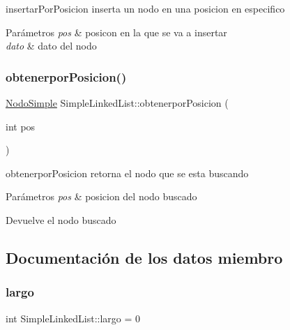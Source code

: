 insertar\+Por\+Posicion inserta un nodo en una posicion en especifico 


\begin{DoxyParams}{Parámetros}
{\em pos} & posicon en la que se va a insertar \\
\hline
{\em dato} & dato del nodo \\
\hline
\end{DoxyParams}
\mbox{\label{class_simple_linked_list_a443815291e245287229b5aca1d963faf}} 
\subsubsection{\texorpdfstring{obtenerpor\+Posicion()}{obtenerporPosicion()}}
{\footnotesize\ttfamily \mbox{\hyperlink{class_nodo_simple}{Nodo\+Simple}} Simple\+Linked\+List\+::obtenerpor\+Posicion (\begin{DoxyParamCaption}\item[{int}]{pos }\end{DoxyParamCaption})\hspace{0.3cm}{\ttfamily [inline]}}



obtenerpor\+Posicion retorna el nodo que se esta buscando 


\begin{DoxyParams}{Parámetros}
{\em pos} & posicion del nodo buscado \\
\hline
\end{DoxyParams}
\begin{DoxyReturn}{Devuelve}
el nodo buscado 
\end{DoxyReturn}


\subsection{Documentación de los datos miembro}
\mbox{\label{class_simple_linked_list_acb900363f7077cdb4036bef55a16671d}} 
\subsubsection{\texorpdfstring{largo}{largo}}
{\footnotesize\ttfamily int Simple\+Linked\+List\+::largo = 0}

